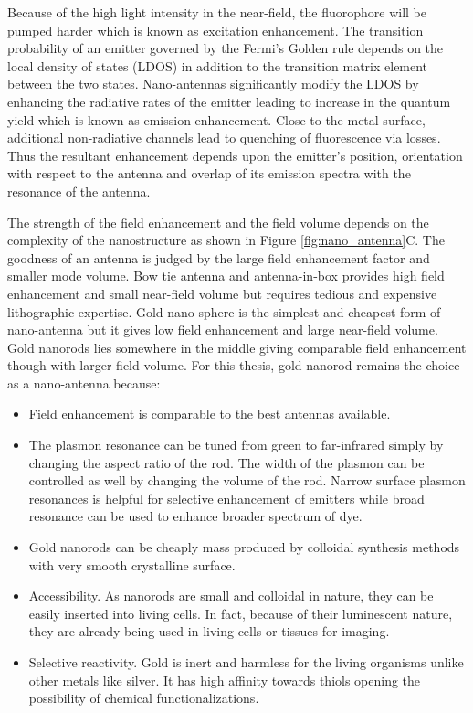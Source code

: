 Because of the high light intensity in the near-field, the fluorophore will be pumped harder which is known as excitation enhancement.
The transition probability of an emitter governed by the Fermi's Golden rule depends on the local density of states (LDOS) in addition to the transition matrix element between the two states.
Nano-antennas significantly modify the LDOS by enhancing the radiative rates of the emitter leading to increase in the quantum yield which is known as emission enhancement.
Close to the metal surface, additional non-radiative channels lead to quenching of fluorescence via losses.
Thus the resultant enhancement depends upon the emitter's position, orientation with respect to the antenna and overlap of its emission spectra with the resonance of the antenna.\cite{anger2006enhancement,khatua2014resonant}

The strength of the field enhancement and the field volume depends on the complexity of the nanostructure as shown in Figure \ref{fig:nano_antenna}C.
The goodness of an antenna is judged by the large field enhancement factor and smaller mode volume.
Bow tie antenna and antenna-in-box provides high field enhancement and small near-field volume but requires tedious and expensive lithographic expertise.\cite{novotny2011antennas,regmi2017thesis}
Gold nano-sphere is the simplest and cheapest form of nano-antenna but it gives low field enhancement and large near-field volume.\cite{punj2013gold}
Gold nanorods lies somewhere in the middle giving comparable field enhancement though with larger field-volume. For this thesis, gold nanorod remains the choice as a nano-antenna because:
\begin{itemize}
	\item Field enhancement is comparable to the best antennas available.
	\item The plasmon resonance can be tuned from green to far-infrared simply by changing the aspect ratio of the rod.\cite{link1999simulation}
	The width of the plasmon can be controlled as well by changing the volume of the rod.
	Narrow surface plasmon resonances is helpful for selective enhancement of emitters while broad resonance can be used to enhance broader spectrum of dye.\cite{yuan2013thousandfold,khatua2014resonant}
	\item Gold nanorods can be cheaply mass produced by colloidal synthesis methods with very smooth crystalline surface.\cite{nikoobakht2003preparation,perezjuste2005gold}
	\item Accessibility. As nanorods are small and colloidal in nature, they can be easily inserted into living cells.
	In fact, because of their luminescent nature, they are already being used in living cells or tissues for imaging.
	\item Selective reactivity. Gold is inert and harmless for the living organisms unlike other metals like silver.
	It has high affinity towards thiols opening the possibility of chemical functionalizations.
\end{itemize}
%

